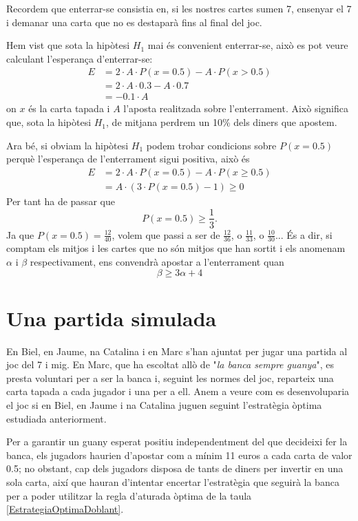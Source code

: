 \documentclass[9pt]{IEEEtran}
\begin{document}
Recordem que enterrar-se consistia en, si les nostres cartes sumen 7, ensenyar el 7 i demanar una carta que no es destaparà fins al final del joc. 

Hem vist que sota la hipòtesi $H_1$ mai és convenient enterrar-se, això es pot veure calculant l'esperança d'enterrar-se:
\begin{align*}
E &= 2\cdot  A \cdot P(x = 0.5) - A \cdot P(x > 0.5) \\
&= 2\cdot A \cdot 0.3 - A\cdot 0.7 \\
&= -0.1\cdot A
\end{align*}
on $x$ és la carta tapada i $A$ l'aposta realitzada sobre l'enterrament. Això significa que, sota la hipòtesi $H_1$, de mitjana perdrem un 10\% dels diners que apostem.

Ara bé, si obviam la hipòtesi $H_1$ podem trobar condicions sobre $P(x = 0.5)$ perquè l'esperança de l'enterrament sigui positiva, això és
\begin{align*}
E &= 2\cdot  A \cdot P(x = 0.5) - A \cdot P(x \geq 0.5) \\
&= A\cdot (3\cdot P(x = 0.5) - 1) \geq 0
\end{align*}
Per tant ha de passar que 
$$P(x = 0.5) \geq \frac{1}{3}.$$
Ja que $P(x = 0.5) = \frac{12}{40}$, volem que passi a ser de $\frac{12}{36}$, o $\frac{11}{33}$, o $\frac{10}{30}$... És a dir, si comptam els mitjos i les cartes que no són mitjos que han sortit i els anomenam $\alpha$ i $\beta$ respectivament, ens convendrà apostar a l'enterrament quan 
$$\beta \geq 3\alpha + 4$$ 

\section{Una partida simulada}

En Biel, en Jaume, na Catalina i en Marc s'han ajuntat per jugar una partida al joc del 7 i mig. En Marc, que ha escoltat allò de "\textit{la banca sempre guanya}", es presta voluntari per a ser la banca i, seguint les normes del joc, reparteix una carta tapada a cada jugador i una per a ell. Anem a veure com es desenvoluparia el joc si en Biel, en Jaume i na Catalina juguen seguint l'estratègia òptima estudiada anteriorment.

Per a garantir un guany esperat positiu independentment del que decideixi fer la banca, els jugadors haurien d'apostar com a mínim 11 euros a cada carta de valor 0.5; no obstant, cap dels jugadors disposa de tants de diners per invertir en una sola carta, així que hauran d'intentar encertar l'estratègia que seguirà la banca per a poder utilitzar la regla d'aturada òptima de la taula \ref{EstrategiaOptimaDoblant}.
\end{document}
